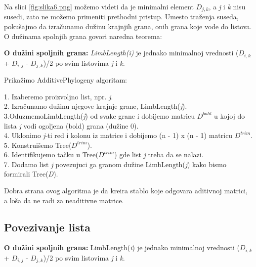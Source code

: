 Na slici \ref{fig:slika6.png} mo\v{z}emo videti da je minimalni element $D_{j,k}$, a \textit{j} i \textit{k} nisu susedi, zato ne mo\v{z}emo primeniti prethodni pristup. Umesto tra\v{z}enja suseda, poku\v{s}ajmo da izra\v{c}unamo du\v{z}inu krajnjih grana, onih grana koje vode do listova. O du\v{z}inama spolnjih grana govori naredna teorema:

\begin{teorema}
\textbf{O du\v{z}ini spoljnih grana:} \textit{LimbLength(i)} je jednako minimalnoj vrednosti ($D_{i, k}$ + $D_{i, j}$ - $D_{j, k}$)/2 po svim listovima \textit{j} i \textit{k}.
\end{teorema}

Prika\v{z}imo AdditivePhylogeny algoritam:

\begin{tcolorbox}
1. Izaberemo proizvoljno list, npr. \textit{j}. \\
2. Izra\v{c}unamo du\v{z}inu njegove krajnje grane, LimbLength(\textit{j}). \\
3.OduzmemoLimbLength(\textit{j}) od svake grane i dobijemo matricu \textit{$D^{bald}$}  u kojoj do lista \textit{j} vodi ogoljena (bold) grana (du\v{z}ine 0). \\
4. Uklonimo \textit{j}-ti red i kolonu iz matrice i dobijemo (n - 1) x (n - 1) matricu \textit{$D^{trim}$}. \\
5. Konstrui\v{s}emo Tree($D^{trim}$). \\
6. Identifikujemo ta\v{c}ku u Tree($D^{trim}$) gde list \textit{j} treba da se nalazi. \\
7. Dodamo list \textit{j} povezujuci ga granom du\v{z}ine LimbLength(\textit{j}) kako bismo formirali Tree(\textit{D}). 
\end{tcolorbox}

Dobra strana ovog algoritma je da kreira stablo koje odgovara aditivnoj matrici, a lo\v{s}a da ne radi za neaditivne matrice.

\subsection{Povezivanje lista}
\label{subsec:povezivanjelista}

\begin{teorema}
\textbf{O du\v{z}ini spoljnih grana:} LimbLength(\textit{i}) je jednako minimalnoj vrednosti ($D_{i, k}$ + $D_{i, j}$ - $D_{j, k}$)/2 po svim listovima \textit{j} i \textit{k}.
\end{teorema}
 
